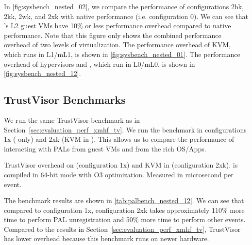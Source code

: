 In \ref{fig:sysbench_nested_02}, we compare the performance of configurations 2bk, 2kk, 2wk, and 2xk with native performance (i.e. configuration 0). We can see that 's L2 guest VMs have 10\% or less performance overhead compared to native performance. Note that this figure only shows the combined performance overhead of two levels of virtualization. The performance overhead of KVM, which runs in L1/mL1, is shown in \ref{fig:sysbench_nested_01}. The performance overhead of hypervisors and , which run in L0/mL0, is shown in \ref{fig:sysbench_nested_12}.

\subsection{TrustVisor Benchmarks}

We run the same TrustVisor benchmark as in Section~\ref{sec:evaluation_perf_xmhf_tv}. We run the benchmark in configurations 1x ( only) and 2xk (KVM in ). This allows us to compare the performance of interacting with PALs from guest VMs and from the rich OS/Apps.

\begin{table}[tbp]
	\begin{center}
	
	\caption[TrustVisor overhead on  and KVM in .]{TrustVisor overhead on  (configuration 1x) and KVM in  (configuration 2xk).  is compiled in 64-bit mode with O3 optimization. Measured in microsecond per event.}
	\label{tab:palbench_nested_12}
	\end{center}
\end{table}

The benchmark results are shown in \ref{tab:palbench_nested_12}. We can see that compared to configuration 1x, configuration 2xk takes approximately 110\% more time to perform PAL unregistration and 50\% more time to perform other events. Compared to the results in Section~\ref{sec:evaluation_perf_xmhf_tv}, TrustVisor has lower overhead because this benchmark runs on newer hardware.

